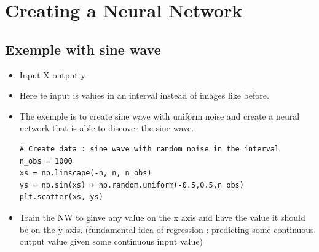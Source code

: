 \documentclass[12pt,a4paper]{article}
\begin{document}
\section{Creating a Neural Network}
\subsection{Exemple with sine wave}
\begin{itemize}
\item Input X output y
\item Here te input is values in an interval instead of images like before.
\item The exemple is to create sine wave with uniform noise and create a neural network that is able to discover the sine wave.
\begin{lstlisting}
# Create data : sine wave with random noise in the interval
n_obs = 1000
xs = np.linscape(-n, n, n_obs)
ys = np.sin(xs) + np.random.uniform(-0.5,0.5,n_obs)
plt.scatter(xs, ys)
\end{lstlisting}
\item Train the NW to ginve any value on the x axis and have the value it should be on the y axis. (fundamental idea of regression : predicting some continuous output value given some continuous input value)
\end{itemize}
\end{document}
